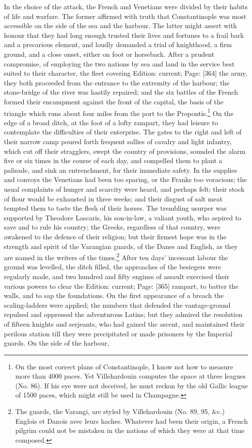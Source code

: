 In the choice of the attack, the French and Venetians were divided by their habits of life and warfare. The former affirmed with truth that Constantinople was most accessible on the side of the sea and the harbour. The latter might assert with honour that they had long enough trusted their lives and fortunes to a frail bark and a precarious element, and loudly demanded a trial of knighthood, a firm ground, and a close onset, either on foot or horseback. After a prudent compromise, of employing the two nations by sea and land in the service best suited to their character, the fleet covering Edition: current; Page: [364] the army, they both proceeded from the entrance to the extremity of the harbour; the stone-bridge of the river was hastily repaired; and the six battles of the French formed their encampment against the front of the capital, the basis of the triangle which runs about four miles from the port to the Propontis.\footnote{On the most correct plans of Constantinople, I know not how to measure more than 4000 paces. Yet Villehardouin computes the space at three leagues (No. 86). If his eye were not deceived, he must reckon by the old Gallic league of 1500 paces, which might still be used in Champagne.} On the edge of a broad ditch, at the foot of a lofty rampart, they had leisure to contemplate the difficulties of their enterprise. The gates to the right and left of their narrow camp poured forth frequent sallies of cavalry and light infantry, which cut off their stragglers, swept the country of provisions, sounded the alarm five or six times in the course of each day, and compelled them to plant a palisade, and sink an entrenchment, for their immediate safety. In the supplies and convoys the Venetians had been too sparing, or the Franks too voracious; the usual complaints of hunger and scarcity were heard, and perhaps felt; their stock of flour would be exhausted in three weeks; and their disgust of salt meat tempted them to taste the flesh of their horses. The trembling usurper was supported by Theodore Lascaris, his son-in-law, a valiant youth, who aspired to save and to rule his country; the Greeks, regardless of that country, were awakened to the defence of their religion; but their firmest hope was in the strength and spirit of the Varangian guards, of the Danes and English, as they are named in the writers of the times.\footnote{The guards, the Varangi, are styled by Villehardouin (No. 89, 95, \&c.) Englois et Danois avec leurs haches. Whatever had been their origin, a French pilgrim could not be mistaken in the nations of which they were at that time composed.} After ten days\texthebrew{}’ incessant labour the ground was levelled, the ditch filled, the approaches of the besiegers were regularly made, and two hundred and fifty engines of assault exercised their various powers to clear the Edition: current; Page: [365] rampart, to batter the walls, and to sap the foundations. On the first appearance of a breach the scaling-ladders were applied; the numbers that defended the vantage-ground repulsed and oppressed the adventurous Latins; but they admired the resolution of fifteen knights and serjeants, who had gained the ascent, and maintained their perilous station till they were precipitated or made prisoners by the Imperial guards. On the side of the harbour, 